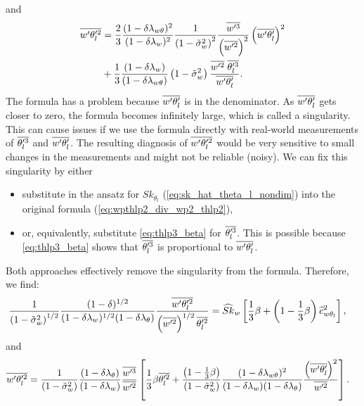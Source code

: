 and
\begin{align}
    \label{eq:wpthlp2_solved}
    \overline{w'\theta_l'^2}
    &= \frac{2}{3} \frac{(1-\delta \lambda_{w \theta})^2}{(1-\delta \lambda_w)^2} \frac{1}{\left( 1 - \tilde{\sigma}_w^2 \right)^2} \frac{\overline{w'^3}}{\left(\overline{w'^2} \right)^2} \left(\overline{w'\theta_l'} \right)^2 \nonumber\\
    &+ \frac{1}{3} \frac{(1-\delta \lambda_w)}{(1-\delta \lambda_{w \theta})} \left( 1 - \tilde{\sigma}_w^2 \right) \frac{\overline{w'^2} \; \overline{\theta_l'^3} }{\overline{w'\theta_l'}}.
\end{align}
The formula has a problem because $\overline{w' \theta_l'}$ is in the denominator.
As $\overline{w' \theta_l'}$ gets closer to zero, the formula becomes infinitely large, which is called a singularity.
This can cause issues if we use the formula directly with real-world measurements of $\overline{\theta_l'^3}$ and $\overline{w' \theta_l'}$.
The resulting diagnosis of $\overline{w' \theta_l'^2}$ would be very sensitive to small changes in the measurements
and might not be reliable (noisy).
We can fix this singularity by either
\begin{itemize}
    \item substitute in the ansatz for $Sk_{\theta_l}$ (\cref{eq:sk_hat_theta_l_nondim})
    into the original formula (\cref{eq:wpthlp2_div_wp2_thlp2}),
    \item or, equivalently, substitute \cref{eq:thlp3_beta} for $\overline{\theta_l'^3}$.
    This is possible because \cref{eq:thlp3_beta} shows that $\overline{\theta_l'^3}$ is proportional to $\overline{w' \theta_l'}$.
\end{itemize}
Both approaches effectively remove the singularity from the formula.
Therefore, we find:
\begin{align}
    \label{eq:wpthlp2_div_wp2_thlp2_sk_w}
    \frac{1}{\left( 1 - \tilde{\sigma}_w^2 \right)^{1/2}} \frac{(1-\delta)^{1/2}}{(1-\delta \lambda_w)^{1/2} (1-\delta \lambda_\theta)} \frac{\overline{w'\theta_l'^2}}{\left(\overline{w'^2}\right)^{1/2} \overline{\theta_l'^2}}
    &= \widehat{Sk}_w \left[\frac{1}{3} \beta + \left(1 - \frac{1}{3} \beta \right) \widehat{c}_{w\theta_l}^2 \right],
\end{align}
and
\begin{align}
    \label{eq:wpthlp2_beta}
    \overline{w'\theta_l'^2}
    &= \frac{1}{\left( 1 - \tilde{\sigma}_w^2 \right)} \frac{(1-\delta \lambda_\theta)}{(1-\delta \lambda_w)}
    \frac{\overline{w'^3}}{\overline{w'^2}}
    \left[ \frac{1}{3} \beta \overline{\theta_l'^2}
    + \frac{\left( 1-\frac{1}{3} \beta \right)}{\left( 1 - \tilde{\sigma}_w^2 \right)}
    \frac{(1-\delta \lambda_{w \theta})^2}{(1-\delta \lambda_w)(1-\delta \lambda_\theta)}
    \frac{\left( \overline{w'\theta_l'} \right)^2}{\overline{w'^2}}
    \right].
\end{align}
